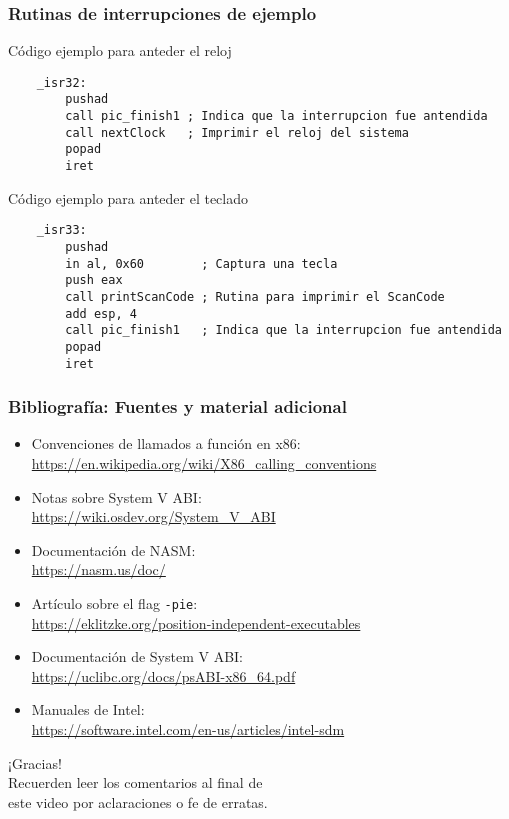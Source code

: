 \documentclass[aspectratio=169]{beamer}
\begin{document}
\begin{frame}[fragile]
\frametitle{Rutinas de interrupciones de ejemplo}
    \begin{block}{\small Código ejemplo para anteder el reloj}
    \vspace{-0.3cm}
    \small
    \begin{verbatim}
    _isr32:
        pushad
        call pic_finish1 ; Indica que la interrupcion fue antendida
        call nextClock   ; Imprimir el reloj del sistema
        popad
        iret
    \end{verbatim}
    \vspace{-0.7cm}
    \end{block}
    \vspace{-0.1cm}
    \begin{block}{\small Código ejemplo para anteder el teclado}
    \vspace{-0.3cm}
    \small
    \begin{verbatim}
    _isr33:
        pushad
        in al, 0x60        ; Captura una tecla
        push eax
        call printScanCode ; Rutina para imprimir el ScanCode
        add esp, 4
        call pic_finish1   ; Indica que la interrupcion fue antendida
        popad
        iret
    \end{verbatim}
    \vspace{-0.7cm}
    \end{block}
\end{frame}

\begin{frame}[fragile]
    \frametitle{Bibliografía: Fuentes y material adicional}
    \begin{itemize}
    \item Convenciones de llamados a función en x86: \\
    \url{https://en.wikipedia.org/wiki/X86_calling_conventions}
    \item Notas sobre System V ABI: \\
    \url{https://wiki.osdev.org/System_V_ABI}
    \item Documentación de NASM: \\
    \url{https://nasm.us/doc/}
    \item Artículo sobre el flag \texttt{-pie}: \\
    \url{https://eklitzke.org/position-independent-executables}
    \item Documentación de System V ABI: \\
    \url{https://uclibc.org/docs/psABI-x86_64.pdf}
    \item Manuales de Intel: \\
    \url{https://software.intel.com/en-us/articles/intel-sdm}
    \end{itemize}
\end{frame}

\begin{frame}[plain]
    \begin{center}
    \vspace{2cm}
    \huge ¡Gracias!\\
    \vspace{2cm}
    \normalsize Recuerden leer los comentarios al final de \\ este video por aclaraciones o fe de erratas.
    \end{center}
\end{frame}
\end{document}

